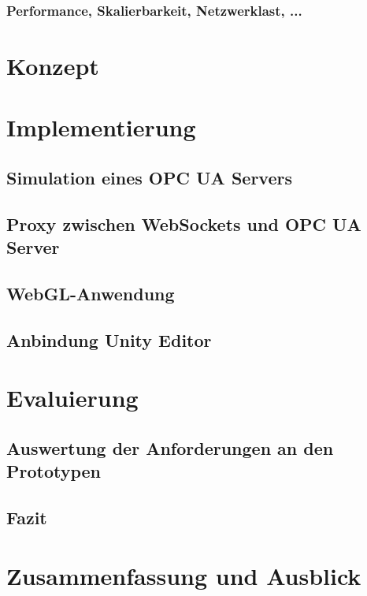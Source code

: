\subsubsection{Performance, Skalierbarkeit, Netzwerklast, ...}
\section{Konzept}
\section{Implementierung}
\subsection{Simulation eines OPC UA Servers}
\subsection{Proxy zwischen WebSockets und OPC UA Server}
\subsection{WebGL-Anwendung}
\subsection{Anbindung Unity Editor}
\section{Evaluierung}
\subsection{Auswertung der Anforderungen an den Prototypen}
\subsection{Fazit}
\section{Zusammenfassung und Ausblick}